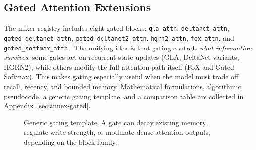 \subsection{Gated Attention Extensions}
The mixer registry includes eight gated blocks: \texttt{gla\_attn}, \texttt{deltanet\_attn}, \texttt{gated\_deltanet\_attn}, \texttt{gated\_deltanet2\_attn}, \texttt{hgrn2\_attn}, \texttt{fox\_attn}, and \texttt{gated\_softmax\_attn} \citep{yang_gla_2023,yang_deltanet_2024,yang_gated_deltanet_2024,hatamizadeh_gated_deltanet2_2026,qin_hgrn2_2024,lin_forgetting_transformer_2025,qiu_gated_attention_2025}. The unifying idea is that gating controls \emph{what information survives}: some gates act on recurrent state updates (GLA, DeltaNet variants, HGRN2), while others modify the full attention path itself (FoX and Gated Softmax). This makes gating especially useful when the model must trade off recall, recency, and bounded memory. Mathematical formulations, algorithmic pseudocode, a generic gating template, and a comparison table are collected in Appendix~\ref{sec:annex-gated}.

\begin{figure}[t]
\centering
{}
\caption{Generic gating template. A gate can decay existing memory, regulate write strength, or modulate dense attention outputs, depending on the block family.}
\label{fig:gating-template}
\end{figure}
